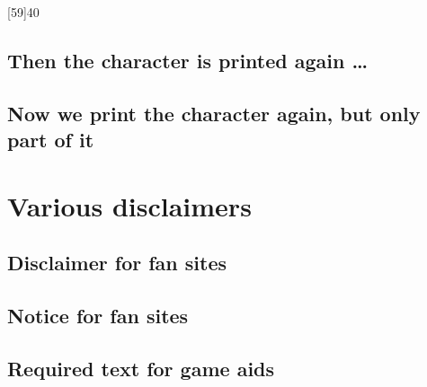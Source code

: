 \documentclass{article}
\begin{document}
\begin{character}
  [59]{40}
\end{character}

\subsection{Then the character is printed again \ldots{}}
\label{sec:then-char-prepr}


\subsection{Now we print the character again, but only part of it}
\label{sec:aasdfasdf}

\makeatother


\section{Various disclaimers}
\label{sec:various-disclaimers}

\subsection{Disclaimer for fan sites}
\label{sec:disclaimer-fan-sites}

\SJGamesOnlinePolicyDisclaimer

\subsection{Notice for fan sites}
\label{sec:disclaimer-fan-sites}

\SJGamesOnlinePolicyNotice

\subsection{Required text for game aids}
\label{sec:disclaimer-fan-sites}

\end{document}
